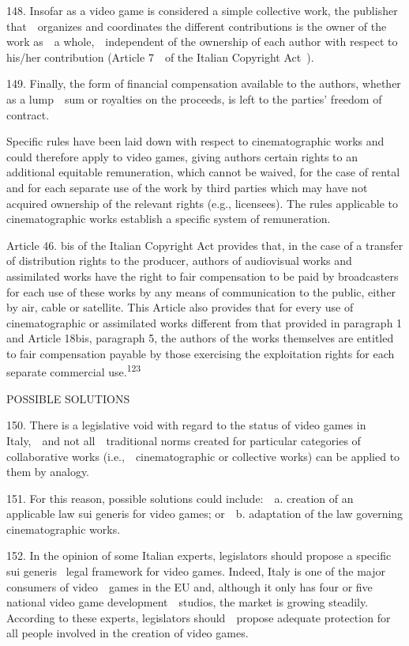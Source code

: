 \documentclass[
]{article}
\begin{document}
{148. }{Insofar as a video game is considered a simple collective work,
the publisher that~~organizes and coordinates the different
contributions is the owner of the work as~~a whole,~~independent of the
ownership of each author with respect to his/her contribution (Article
7~~of the Italian }{Copyright Act}{~).}

{149. }{Finally, the form of financial compensation available to the
authors, whether as a lump~~sum or royalties on the proceeds, }{is left
to the parties' freedom of contract}{.}

{Specific rules have been laid down with respect to cinematographic
works and could therefore apply to video games, giving authors certain
rights to an additional equitable remuneration, which cannot be waived,
for the case of rental and for each separate use of the work by third
parties which may have not acquired ownership of the relevant rights
(e.g., licensees). The rules applicable to cinematographic works
establish a specific system of remuneration.}

{Article 46. }{bis }{of the Italian }{Copyright Act }{provides that, in
the case of a transfer of distribution rights to the producer, authors
of audiovisual works and assimilated works have the right to fair
compensation to be paid by broadcasters for each use of these works by
any means of communication to the public, either by air, cable or
satellite. This Article also provides that for every use of
cinematographic or assimilated works different from that provided in
paragraph 1 and Article 18}{bis}{, paragraph 5, the authors of the works
themselves are entitled to fair compensation payable by those exercising
the exploitation rights for each separate commercial
use.}\textsuperscript{{123}}

{POSSIBLE SOLUTIONS}

{150. }{There is a legislative void with regard to the status of video
games in Italy,~~and not all~~traditional norms created for particular
categories of collaborative works (i.e.,~~cinematographic or collective
works) can be applied to them by analogy.}

{151. }{For this reason, possible solutions could include:~~a. creation
of an applicable law }{sui generis }{for video games; or~~b. adaptation
of the law governing cinematographic works.}

{152. }{In the opinion of some Italian experts, legislators should
propose a specific }{sui generis }{~legal framework for video games.
Indeed, Italy is one of the major consumers of video~~games in the EU
and, although it only has four or five national video game
development~~studios, the market is growing steadily. According to these
experts, legislators should~~propose adequate protection for all people
involved in the creation of video games.}
\end{document}
